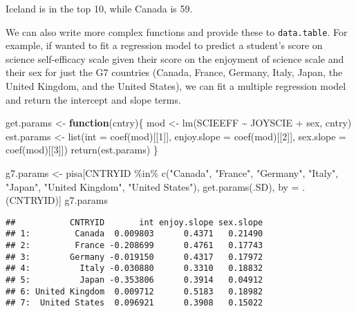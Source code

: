\documentclass[
]{book}
\newenvironment{Shaded}{\begin{snugshade}}{\end{snugshade}}
\newcommand{\AttributeTok}[1]{\textcolor[rgb]{0.77,0.63,0.00}{#1}}
\newcommand{\ControlFlowTok}[1]{\textcolor[rgb]{0.13,0.29,0.53}{\textbf{#1}}}
\newcommand{\DecValTok}[1]{\textcolor[rgb]{0.00,0.00,0.81}{#1}}
\newcommand{\FunctionTok}[1]{\textcolor[rgb]{0.00,0.00,0.00}{#1}}
\newcommand{\NormalTok}[1]{#1}
\newcommand{\OtherTok}[1]{\textcolor[rgb]{0.56,0.35,0.01}{#1}}
\newcommand{\SpecialCharTok}[1]{\textcolor[rgb]{0.00,0.00,0.00}{#1}}
\newcommand{\StringTok}[1]{\textcolor[rgb]{0.31,0.60,0.02}{#1}}
\begin{document}
Iceland is in the top 10, while Canada is 59.

We can also write more complex functions and provide these to \texttt{data.table}. For example, if wanted to fit a regression model to predict a student's score on science self-efficacy scale given their score on the enjoyment of science scale and their sex for just the G7 countries (Canada, France, Germany, Italy, Japan, the United Kingdom, and the United States), we can fit a multiple regression model and return the intercept and slope terms.

\begin{Shaded}
\begin{Highlighting}[]
\NormalTok{get.params }\OtherTok{\textless{}{-}} \ControlFlowTok{function}\NormalTok{(cntry)\{}
\NormalTok{  mod }\OtherTok{\textless{}{-}} \FunctionTok{lm}\NormalTok{(SCIEEFF }\SpecialCharTok{\textasciitilde{}}\NormalTok{ JOYSCIE }\SpecialCharTok{+}\NormalTok{ sex, cntry)}
\NormalTok{  est.params }\OtherTok{\textless{}{-}} \FunctionTok{list}\NormalTok{(}\AttributeTok{int =} \FunctionTok{coef}\NormalTok{(mod)[[}\DecValTok{1}\NormalTok{]], }\AttributeTok{enjoy.slope =} \FunctionTok{coef}\NormalTok{(mod)[[}\DecValTok{2}\NormalTok{]], }\AttributeTok{sex.slope =} \FunctionTok{coef}\NormalTok{(mod)[[}\DecValTok{3}\NormalTok{]])}
  \FunctionTok{return}\NormalTok{(est.params)}
\NormalTok{\}}

\NormalTok{g7.params }\OtherTok{\textless{}{-}}\NormalTok{ pisa[CNTRYID }\SpecialCharTok{\%in\%} \FunctionTok{c}\NormalTok{(}\StringTok{"Canada"}\NormalTok{, }\StringTok{"France"}\NormalTok{, }\StringTok{"Germany"}\NormalTok{, }\StringTok{"Italy"}\NormalTok{,}
                                 \StringTok{"Japan"}\NormalTok{, }\StringTok{"United Kingdom"}\NormalTok{, }\StringTok{"United States"}\NormalTok{),}
               \FunctionTok{get.params}\NormalTok{(.SD), }
\NormalTok{               by }\OtherTok{=}\NormalTok{ .(CNTRYID)]}
\NormalTok{g7.params}
\end{Highlighting}
\end{Shaded}

\begin{verbatim}
##           CNTRYID       int enjoy.slope sex.slope
## 1:         Canada  0.009803      0.4371   0.21490
## 2:         France -0.208699      0.4761   0.17743
## 3:        Germany -0.019150      0.4317   0.17972
## 4:          Italy -0.030880      0.3310   0.18832
## 5:          Japan -0.353806      0.3914   0.04912
## 6: United Kingdom  0.009712      0.5183   0.18982
## 7:  United States  0.096921      0.3908   0.15022
\end{verbatim}
\end{document}
